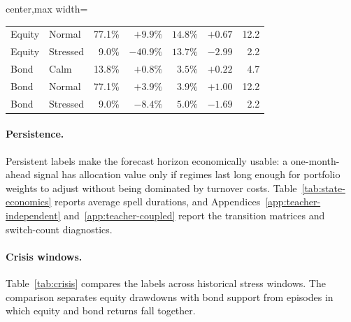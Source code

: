 ﻿\documentclass[10pt]{article}
\begin{document}
\begin{table}[H]
\begin{adjustbox}{center,max width=\textwidth}
\begin{tabular}{@{}llrrrrr@{}}
            Equity & Normal       & 77.1\%           & $+9.9\%$   & $14.8\%$   & $+0.67$ & 12.2           \\
            Equity & Stressed     & \phantom{0}9.0\% & $-40.9\%$  & $13.7\%$   & $-2.99$ & \phantom{0}2.2 \\
            Bond   & Calm         & 13.8\%           & $+0.8\%$   & $3.5\%$    & $+0.22$ & \phantom{0}4.7 \\
            Bond   & Normal       & 77.1\%           & $+3.9\%$   & $3.9\%$    & $+1.00$ & 12.2           \\
            Bond   & Stressed     & \phantom{0}9.0\% & $-8.4\%$   & $5.0\%$    & $-1.69$ & \phantom{0}2.2 \\
            \bottomrule
        \end{tabular}
    \end{adjustbox}
\end{table}

\paragraph{Persistence.}
Persistent labels make the forecast horizon economically usable: a one-month-ahead signal has
allocation value only if regimes last long enough for portfolio weights to adjust without
being dominated by turnover costs. Table~\ref{tab:state-economics} reports average spell
durations, and Appendices~\ref{app:teacher-independent} and~\ref{app:teacher-coupled} report
the transition matrices and switch-count diagnostics.

\paragraph{Crisis windows.}
Table~\ref{tab:crisis} compares the labels across historical stress windows. The comparison
separates equity drawdowns with bond support from episodes in which equity and bond returns
fall together.
\end{document}
